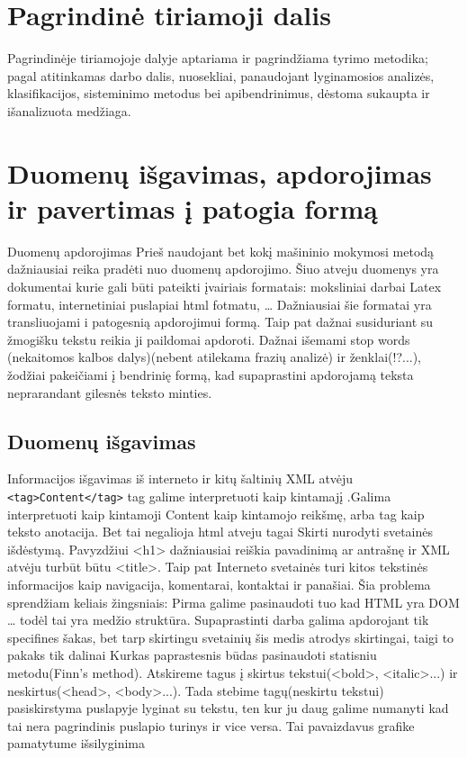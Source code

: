 \documentclass{VUMIFInfKursinis}
\begin{document}
\section{Pagrindinė tiriamoji dalis}
Pagrindinėje tiriamojoje dalyje aptariama ir pagrindžiama tyrimo metodika;
pagal atitinkamas darbo dalis, nuosekliai, panaudojant lyginamosios analizės,
klasifikacijos, sisteminimo metodus bei apibendrinimus, dėstoma sukaupta ir
išanalizuota medžiaga.

\section{Duomenų išgavimas, apdorojimas ir pavertimas į patogia formą}
Duomenų apdorojimas
	Prieš naudojant bet kokį mašininio mokymosi metodą dažniausiai reika pradėti nuo duomenų apdorojimo. Šiuo atveju duomenys yra dokumentai kurie gali būti pateikti įvairiais formatais: moksliniai darbai Latex formatu, internetiniai puslapiai html fotmatu, … Dažniausiai šie formatai yra transliuojami i patogesnią apdorojimui formą. Taip pat dažnai susiduriant su žmogišku tekstu reikia ji paildomai apdoroti. Dažnai išemami stop words (nekaitomos kalbos dalys)(nebent atilekama frazių analizė) ir ženklai(!?...), žodžiai pakeičiami į bendrinię formą, kad supaprastini apdorojamą teksta neprarandant gilesnės teksto minties. 
\subsection{Duomenų išgavimas}
Informacijos išgavimas iš interneto ir kitų šaltinių
	XML atvėju \texttt{<tag>Content</tag>} tag galime interpretuoti kaip kintamajį .Galima interpretuoti kaip  kintamoji Content kaip kintamojo reikšmę, arba tag kaip teksto anotacija. Bet tai negalioja html atveju tagai Skirti nurodyti svetainės išdėstymą. Pavyzdžiui <h1> dažniausiai reiškia pavadinimą ar antrašnę ir XML atvėju turbūt būtu <title>. Taip pat Interneto svetainės turi  kitos tekstinės informacijos kaip navigacija, komentarai, kontaktai ir panašiai. Šia problema sprendžiam keliais žingsniais:
Pirma galime pasinaudoti tuo kad HTML yra DOM … todėl tai yra medžio struktūra. Supaprastinti darba galima apdorojant tik specifines šakas, bet tarp skirtingu svetainių šis medis atrodys skirtingai, taigi to pakaks tik dalinai
Kurkas paprastesnis būdas pasinaudoti statisniu metodu(Finn’s method). Atskireme tagus į skirtus tekstui(<bold>, <italic>...) ir neskirtus(<head>, <body>...). Tada stebime tagų(neskirtu tekstui) pasiskirstyma puslapyje lyginat su tekstu, ten kur ju daug galime numanyti kad tai nera pagrindinis puslapio turinys ir vice versa. Tai pavaizdavus grafike pamatytume išsilyginima
\end{document}

